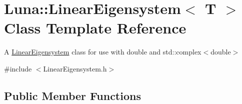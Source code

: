 \hypertarget{classLuna_1_1LinearEigensystem}{}\section{Luna\+:\+:Linear\+Eigensystem$<$ T $>$ Class Template Reference}
\label{classLuna_1_1LinearEigensystem}


A \hyperlink{classLuna_1_1LinearEigensystem}{Linear\+Eigensystem} class for use with double and std\+::complex$<$double$>$  




{\ttfamily \#include $<$Linear\+Eigensystem.\+h$>$}

\subsection*{Public Member Functions}
